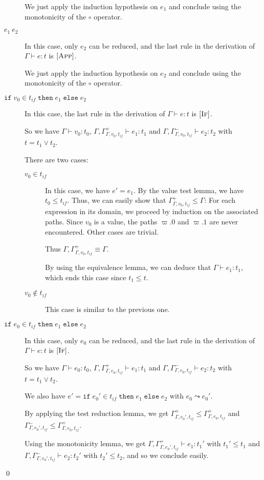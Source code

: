 \documentclass[a4paper]{article}%
\newcommand{\ite}[4]{\ensuremath{\texttt{if}\;#1\in#2\;\texttt{then}\;#3\;\texttt{else}\;#4}}
\theoremstyle{definition}
\newcommand {\Rule}[1] {[\textsc{#1}]}
\begin{document}
\begin{description}
          We just apply the induction hypothesis on $e_1$ and conclude using the monotonicity of the $\circ$ operator.
          \item[$e_1\ e_2$] In this case, only $e_2$ can be reduced, and the last rule in the derivation of $\Gamma \vdash e:t$ is $\Rule{App}$.
    
          We just apply the induction hypothesis on $e_2$ and conclude using the monotonicity of the $\circ$ operator.
          \item[$\ite {v_0} {t_{if}} {e_1} {e_2}$] In this case, the last rule in the derivation of $\Gamma \vdash e:t$ is $\Rule{If}$.
           
          So we have $\Gamma \vdash v_0 : t_0$, $\Gamma, \Gamma^+_{\Gamma,v_0,t_{if}}\vdash e_1 : t_1$ and $\Gamma, \Gamma^-_{\Gamma,v_0,t_{if}}\vdash e_2 : t_2$ with $t=t_1\vee t_2$.
    
          There are two cases:
          \begin{description}
            \item[$v_0 \in t_{if}$] In this case, we have $e'=e_1$.
            By the value test lemma, we have $t_0 \leq t_{if}$.
            Thus, we can easily show that $\Gamma^+_{\Gamma,v_0,t_{if}} \leq \Gamma$:
            For each expression in its domain, we proceed by induction on the associated paths.
            Since $v_0$ is a value, the paths $\varpi.0$ and $\varpi.1$ are never encountered. Other cases are trivial.
    
            Thus $\Gamma, \Gamma^+_{\Gamma,v_0,t_{if}} \equiv \Gamma$.
    
            By using the equivalence lemma, we can deduce that $\Gamma \vdash e_1 : t_1$, which ends this case since $t_1 \leq t$.
            \item[$v_0 \not\in t_{if}$] This case is similar to the previous one.
          \end{description}
            
          \item[$\ite {e_0} {t_{if}} {e_1} {e_2}$] In this case, only $e_0$ can be reduced, and the last rule in the derivation of $\Gamma \vdash e:t$ is $\Rule{If}$.
          
          So we have $\Gamma \vdash e_0 : t_0$, $\Gamma, \Gamma^+_{\Gamma,e_0,t_{if}}\vdash e_1 : t_1$ and $\Gamma, \Gamma^-_{\Gamma,e_0,t_{if}}\vdash e_2 : t_2$ with $t=t_1\vee t_2$.
          
          We also have $e'=\ite {e_0'} {t_{if}} {e_1} {e_2}$ with $e_0\leadsto e_0'$.
    
          By applying the test reduction lemma, we get $\Gamma^+_{\Gamma,e_0',t_{if}} \leq \Gamma^+_{\Gamma,e_0,t_{if}}$ and
          $\Gamma^-_{\Gamma,e_0',t_{if}} \leq \Gamma^+_{\Gamma,e_0,t_{if}}$.
    
          Using the monotonicity lemma, we get $\Gamma, \Gamma^+_{\Gamma,e_0',t_{if}}\vdash e_1 : t_1'$ with $t_1'\leq t_1$
          and $\Gamma, \Gamma^-_{\Gamma,e_0',t_{if}}\vdash e_2 : t_2'$ with $t_2'\leq t_2$, and so we conclude easily.
        \end{description}
    
        \qed
\end{document}

